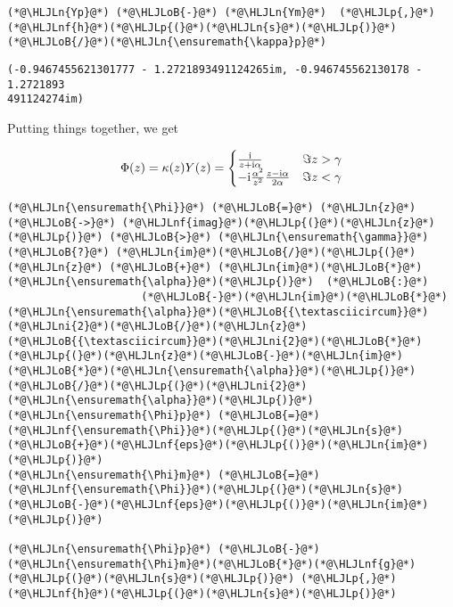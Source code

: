 \documentclass[12pt,landscape]{article}
\newcommand{\HLJLn}[1]{#1}
\newcommand{\HLJLnf}[1]{\textcolor[RGB]{66,102,213}{#1}}
\newcommand{\HLJLni}[1]{\textcolor[RGB]{59,151,46}{#1}}
\newcommand{\HLJLoB}[1]{\textcolor[RGB]{102,102,102}{\textbf{#1}}}
\newcommand{\HLJLp}[1]{#1}
\def\I{ {\rm i} }
\begin{document}
{\begin{lstlisting}
(*@\HLJLn{Yp}@*) (*@\HLJLoB{-}@*) (*@\HLJLn{Ym}@*)  (*@\HLJLp{,}@*) (*@\HLJLnf{h}@*)(*@\HLJLp{(}@*)(*@\HLJLn{s}@*)(*@\HLJLp{)}@*)(*@\HLJLoB{/}@*)(*@\HLJLn{\ensuremath{\kappa}p}@*)
\end{lstlisting}

\begin{lstlisting}
(-0.9467455621301777 - 1.2721893491124265im, -0.946745562130178 - 1.2721893
491124274im)
\end{lstlisting}


Putting things together, we get

\[
\Phi(z) = \kappa(z) Y(z) = \begin{cases} {\I \over z+\I \alpha }& \Im z > \gamma \\
                        -\I {\alpha^2 \over z^2} {z-\I \alpha \over 2 \alpha} & \Im z < \gamma
\end{cases}
\]

\begin{lstlisting}
(*@\HLJLn{\ensuremath{\Phi}}@*) (*@\HLJLoB{=}@*) (*@\HLJLn{z}@*) (*@\HLJLoB{->}@*) (*@\HLJLnf{imag}@*)(*@\HLJLp{(}@*)(*@\HLJLn{z}@*)(*@\HLJLp{)}@*) (*@\HLJLoB{>}@*) (*@\HLJLn{\ensuremath{\gamma}}@*) (*@\HLJLoB{?}@*) (*@\HLJLn{im}@*)(*@\HLJLoB{/}@*)(*@\HLJLp{(}@*)(*@\HLJLn{z}@*) (*@\HLJLoB{+}@*) (*@\HLJLn{im}@*)(*@\HLJLoB{*}@*)(*@\HLJLn{\ensuremath{\alpha}}@*)(*@\HLJLp{)}@*)  (*@\HLJLoB{:}@*)
                     (*@\HLJLoB{-}@*)(*@\HLJLn{im}@*)(*@\HLJLoB{*}@*)(*@\HLJLn{\ensuremath{\alpha}}@*)(*@\HLJLoB{{\textasciicircum}}@*)(*@\HLJLni{2}@*)(*@\HLJLoB{/}@*)(*@\HLJLn{z}@*)(*@\HLJLoB{{\textasciicircum}}@*)(*@\HLJLni{2}@*)(*@\HLJLoB{*}@*) (*@\HLJLp{(}@*)(*@\HLJLn{z}@*)(*@\HLJLoB{-}@*)(*@\HLJLn{im}@*)(*@\HLJLoB{*}@*)(*@\HLJLn{\ensuremath{\alpha}}@*)(*@\HLJLp{)}@*)(*@\HLJLoB{/}@*)(*@\HLJLp{(}@*)(*@\HLJLni{2}@*)(*@\HLJLn{\ensuremath{\alpha}}@*)(*@\HLJLp{)}@*)
(*@\HLJLn{\ensuremath{\Phi}p}@*) (*@\HLJLoB{=}@*) (*@\HLJLnf{\ensuremath{\Phi}}@*)(*@\HLJLp{(}@*)(*@\HLJLn{s}@*)(*@\HLJLoB{+}@*)(*@\HLJLnf{eps}@*)(*@\HLJLp{()}@*)(*@\HLJLn{im}@*)(*@\HLJLp{)}@*)
(*@\HLJLn{\ensuremath{\Phi}m}@*) (*@\HLJLoB{=}@*) (*@\HLJLnf{\ensuremath{\Phi}}@*)(*@\HLJLp{(}@*)(*@\HLJLn{s}@*)(*@\HLJLoB{-}@*)(*@\HLJLnf{eps}@*)(*@\HLJLp{()}@*)(*@\HLJLn{im}@*)(*@\HLJLp{)}@*)

(*@\HLJLn{\ensuremath{\Phi}p}@*) (*@\HLJLoB{-}@*) (*@\HLJLn{\ensuremath{\Phi}m}@*)(*@\HLJLoB{*}@*)(*@\HLJLnf{g}@*)(*@\HLJLp{(}@*)(*@\HLJLn{s}@*)(*@\HLJLp{)}@*) (*@\HLJLp{,}@*) (*@\HLJLnf{h}@*)(*@\HLJLp{(}@*)(*@\HLJLn{s}@*)(*@\HLJLp{)}@*)
\end{lstlisting}

}
\end{document}
